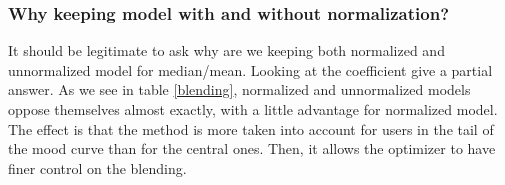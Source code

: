 \documentclass[10pt,conference,compsocconf]{IEEEtran}
\begin{document}
\subsubsection{Why keeping model with and without normalization?}

It should be legitimate to ask why are we keeping both normalized and unnormalized model for median/mean. Looking at the coefficient give a partial answer. As we see in table \ref{blending}, normalized and unnormalized models oppose themselves almost exactly, with a little advantage for normalized model. The effect is that the method is more taken into account for users in the tail of the mood curve than for the central ones. Then, it allows the optimizer to have finer control on the blending.









\end{document}
